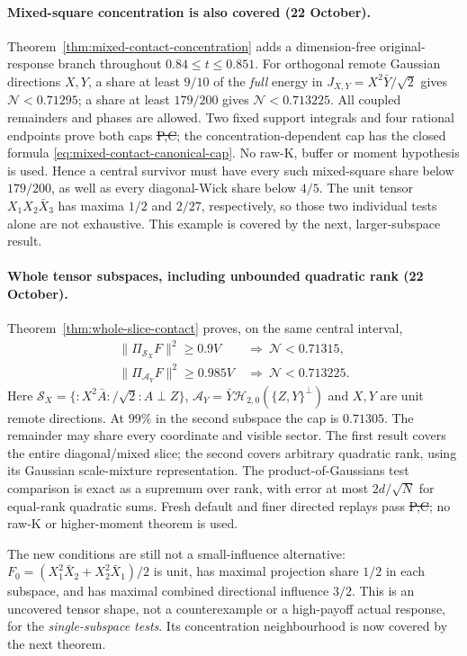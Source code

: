 \paragraph{Mixed-square concentration is also covered (22 October).}
Theorem~\ref{thm:mixed-contact-concentration} adds a dimension-free
original-response branch throughout $0.84\le t\le0.851$.
For orthogonal remote Gaussian directions $X,Y$, a share at least
$9/10$ of the \emph{full} energy in $J_{X,Y}=X^2\bar Y/\sqrt2$
gives $\mathcal N<0.71295$; a share at least $179/200$ gives
$\mathcal N<0.713225$. All coupled remainders and phases are allowed.
Two fixed support integrals and four rational endpoints prove both
caps \st{P,C}; the concentration-dependent cap has the closed formula
\eqref{eq:mixed-contact-canonical-cap}. No raw-K, buffer or moment
hypothesis is used. Hence a central survivor must have every such
mixed-square share below $179/200$, as well as every diagonal-Wick share
below $4/5$. The unit tensor $X_1X_2\bar X_3$ has maxima $1/2$ and
$2/27$, respectively, so those two individual tests alone are not
exhaustive. This example is covered by the next, larger-subspace result.

\paragraph{Whole tensor subspaces, including unbounded quadratic rank
(22 October).}
Theorem~\ref{thm:whole-slice-contact} proves, on the same central interval,
\[
 \begin{aligned}
 \|\Pi_{\mathcal S_X}F\|^2\ge0.9V&\ \Longrightarrow\ \mathcal N<0.71315,\\
 \|\Pi_{\mathcal A_Y}F\|^2\ge0.985V&\ \Longrightarrow\ \mathcal N<0.713225.
 \end{aligned}
\]
Here $\mathcal S_X=\{{:}X^2\bar A{:}/\sqrt2:A\perp Z\}$,
$\mathcal A_Y=\bar Y\mathcal H_{2,0}(\{Z,Y\}^\perp)$ and $X,Y$
are unit remote directions. At $99\%$ in the second subspace the cap
is $0.71305$. The remainder may share every coordinate and visible
sector. The first result covers the entire diagonal/mixed slice;
the second covers arbitrary quadratic rank, using its Gaussian
scale-mixture representation. The product-of-Gaussians test comparison
is exact as a supremum over rank, with error at most $2d/\sqrt N$ for
equal-rank quadratic sums. Fresh default and finer directed replays
pass \st{P,C}; no raw-K or higher-moment theorem is used.

The new conditions are still not a small-influence alternative:
$F_0=(X_1^2\bar X_2+X_2^2\bar X_1)/2$ is unit, has maximal projection
share $1/2$ in each subspace, and has maximal combined directional
influence $3/2$. This is an uncovered tensor shape, not a counterexample
or a high-payoff actual response, for the \emph{single-subspace tests}.
Its concentration neighbourhood is now covered by the next theorem.

